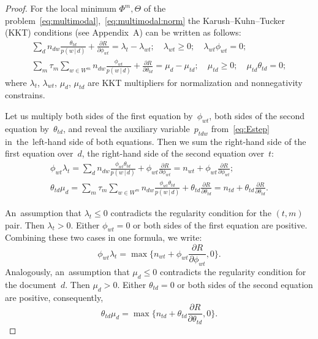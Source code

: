 \documentclass[russian]{llncs}
\newcommand{\cond}{\mspace{3mu}{|}\mspace{3mu}}
\begin{document}
\begin{proof}
    For the local minimum $\Phi^m,\Theta$
    of the problem~\eqref{eq:multimodal},~\eqref{eq:multimodal:norm}
    the Karush--Kuhn--Tucker (KKT) conditions (see Appendix~A) can be written as follows:
    \begin{gather*}
        \sum_{d} n_{dw} \frac{\theta_{td}}{p(w\cond d)} + \frac{\partial R}{\partial \phi_{wt}}
        = \lambda_t - \lambda_{wt};
        \quad
        \lambda_{wt}\geq 0;
        \quad
        \lambda_{wt}\phi_{wt} = 0;
    \\
        \sum_{m} \tau_m \!\!\sum_{w\in W^m}\!\! n_{dw} \frac{\phi_{wt}}{p(w\cond d)} + \frac{\partial R}{\partial \theta_{td}}
        = \mu_d - \mu_{td};
        \quad
        \mu_{td}\geq 0;
        \quad
        \mu_{td}\theta_{td} = 0;
    \end{gather*}
    where $\lambda_t$, $\lambda_{wt}$, $\mu_d$, $\mu_{td}$
    are KKT multipliers for normalization and nonnegativity constrains.

    Let us multiply
    both sides of the first equation by~$\phi_{wt}$,
    both sides of the second equation by~$\theta_{td}$,
    and reveal the auxiliary variable~$p_{tdw}$ from~\eqref{eq:Estep}
    in~the~left-hand side of both equations.
    Then we sum
    the right-hand side of the first equation over~$d$,
    the right-hand side of the second equation over~$t$:
    \begin{gather*}
        \phi_{wt} \lambda_t
        =
        \sum_{d}
        n_{dw} \frac{\phi_{wt}\theta_{td}}{p(w\cond d)}
        + \phi_{wt} \frac{\partial R}{\partial \phi_{wt}}
        =
        n_{wt} + \phi_{wt} \frac{\partial R}{\partial \phi_{wt}};
    \\
        \theta_{td} \mu_{d}
        =
        \sum_{m} \tau_m \!\!\sum_{w\in W^m}\!\!
        n_{dw} \frac{\phi_{wt}\theta_{td}}{p(w\cond d)}
        + \theta_{td} \frac{\partial R}{\partial \theta_{td}}
        =
        n_{td} + \theta_{td} \frac{\partial R}{\partial \theta_{td}}.
    \end{gather*}

    An~assumption that $\lambda_t\leq 0$ contradicts the regularity condition for the $(t,m)$ pair.
    Then ${\lambda_t>0}$.
    Either ${\phi_{wt}= 0}$ or both sides of the first equation are positive.
    Combining these two cases in one formula, we write:
    \begin{equation}
    \label{eq:in-theorem-1:phi}
        \phi_{wt} \lambda_t
        =
        \max\biggl\{
        n_{wt} + \phi_{wt} \frac{\partial R}{\partial \phi_{wt}}, 0
        \biggr\}.
    \end{equation}
    Analogously,
    an~assumption that $\mu_d\leq 0$ contradicts the regularity condition for the document~$d$.
    Then ${\mu_d>0}$.
    Either ${\theta_{td}= 0}$ or both sides of the second equation are positive,
    consequently,
    \begin{equation}
    \label{eq:in-theorem-1:theta}
        \theta_{td} \mu_d
        =
        \max\biggl\{
        n_{td} + \theta_{td} \frac{\partial R}{\partial \theta_{td}}, 0
        \biggr\}.
    \end{equation}


\end{proof}
\end{document}
